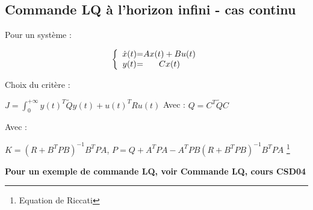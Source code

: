 {{{\subsection{Commande LQ à l'horizon infini - cas continu}
Pour un système :
\begin{center}
    \Large{
        \[
        \left \{
        \begin{array}{c @{=} c}
            \dot x(t) & Ax(t) + Bu(t)\\
            y(t) & Cx(t)
        \end{array}
        \right.
        \]
    }
\end{center}
Choix du critère : 
\begin{center}
    \Large{$
        J = \int_{0}^{+\infty}{
        y(t)^{T}\tilde{Q}y(t) + u(t)^{T}Ru(t)
        }
    $} Avec : 
    \Large{$
    Q = C^{T}\tilde{Q}C
    $}
\end{center}
\begin{center}
    \Large{
    }
    Avec : 
    \begin{center}
        $K = (R + B^{T}PB)^{-1}B^{T}PA$, \newline
        $P = Q + A^{T}PA - A^{T}PB(R + B^{T}PB)^{-1}B^{T}PA$ \footnote{Equation de Riccati}
    \end{center}
\end{center}
\textbf{Pour un exemple de commande LQ, voir Commande LQ, cours CSD04}
\newpage
}}}
